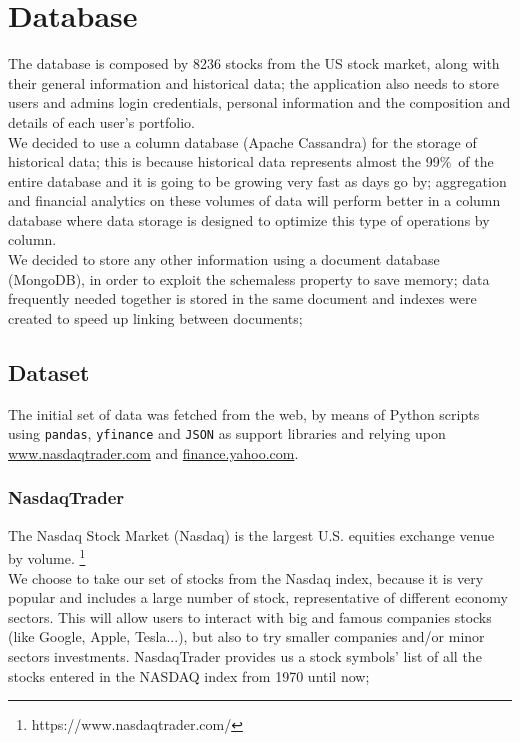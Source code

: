 \chapter{Database}
The database is composed by 8236 stocks from the US stock market, along with
their general information and historical data; the application also needs to
store users and admins login credentials, personal information and the
composition and details of each user's portfolio.\\
We decided to use a column database (Apache Cassandra) for the storage of
historical data; this is because historical data represents almost the 99\%\ of
the entire database and it is going to be growing very fast as days go by;
aggregation and financial analytics on these volumes of data will perform better
in a column database where data storage is designed to optimize this type of
operations by column.\\
We decided to store any other information using a document database (MongoDB),
in order to exploit the schemaless property to save memory; data frequently
needed together is stored in the same document and indexes were created to speed
up linking between documents; 

\section{Dataset}
The initial set of data was fetched from the web, by means of Python scripts using
\texttt{pandas}, \texttt{yfinance} and \texttt{JSON} as support libraries and
relying upon \url{www.nasdaqtrader.com} and \url{finance.yahoo.com}.
\subsection{NasdaqTrader}
The Nasdaq Stock Market (Nasdaq) is the largest U.S. equities exchange venue by volume. 
\footnote{https://www.nasdaqtrader.com/} \\
We choose to take our set of stocks from the Nasdaq index, because it is very popular and
includes a large number of stock, representative of different economy sectors. This will allow 
users to interact with big and famous companies stocks (like Google, Apple, Tesla...), but also
to try smaller companies and/or minor sectors investments. 
NasdaqTrader provides us a stock symbols' list of all the stocks entered in the NASDAQ index
from 1970 until now;
